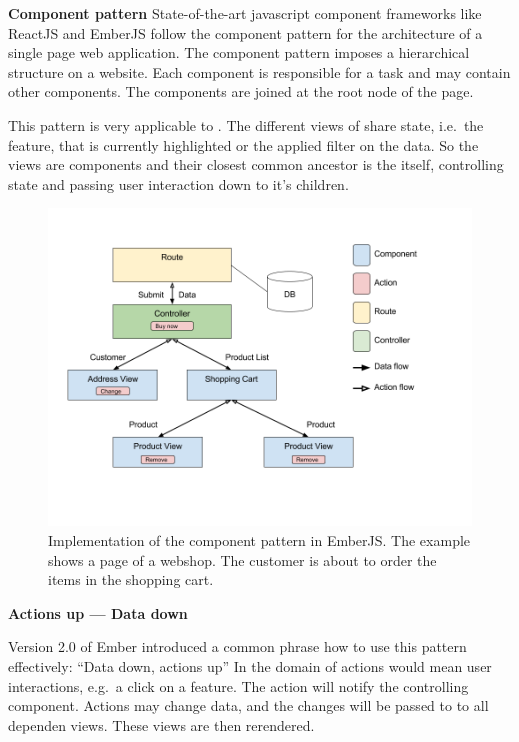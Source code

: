\textbf{Component pattern}
State-of-the-art javascript component frameworks like ReactJS and EmberJS follow the component pattern for the architecture of a single page web application.
The component pattern imposes a hierarchical structure on a website.
Each component is responsible for a task and may contain other components.
The components are joined at the root node of the page.

This pattern is very applicable to \cmvs{}.
The different views of \cmvs{} share state, i.e.\ the feature, that is currently highlighted or the applied filter on the data.
So the views are components and their closest common ancestor is the \cmv{} itself, controlling state and passing user interaction down to it's children.

\begin{figure}[h!]
  \centering
  \includegraphics[width=\textwidth]{images/data-down-actions-up.png}
  \caption{%
    Implementation of the component pattern in EmberJS\@.
    The example shows a page of a webshop.
    The customer is about to order the items in the shopping cart.
  }\label{fig:implementation:data-down-actions-up}
\end{figure}

\textbf{Actions up --- Data down}

Version 2.0 of Ember introduced a common phrase how to use this pattern effectively: ``Data down, actions up''\cite{Emberigniter2017}
In the domain of \cmvs{} actions would mean user interactions, e.g.\ a click on a feature.
The action will notify the controlling \cmv{} component.
Actions may change data, and the changes will be passed to to all dependen views.
These views are then rerendered.

